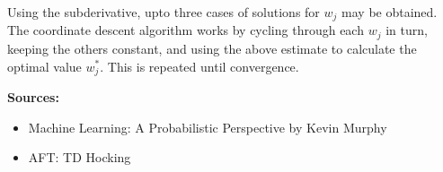 \documentclass[12pt,a4paper]{report}
\begin{document}
Using the subderivative, upto three cases of solutions for $w_j$ may be obtained. The coordinate descent algorithm works by
cycling through each $w_j$ in turn, keeping the others constant, and using the above estimate to calculate the optimal value
$w^*_j$. This is repeated until convergence.

\vspace{8mm}
\textbf{Sources:}
\begin{itemize}
\item Machine Learning: A Probabilistic Perspective by Kevin Murphy
\item AFT: TD Hocking
\end{itemize}
\end{document}
